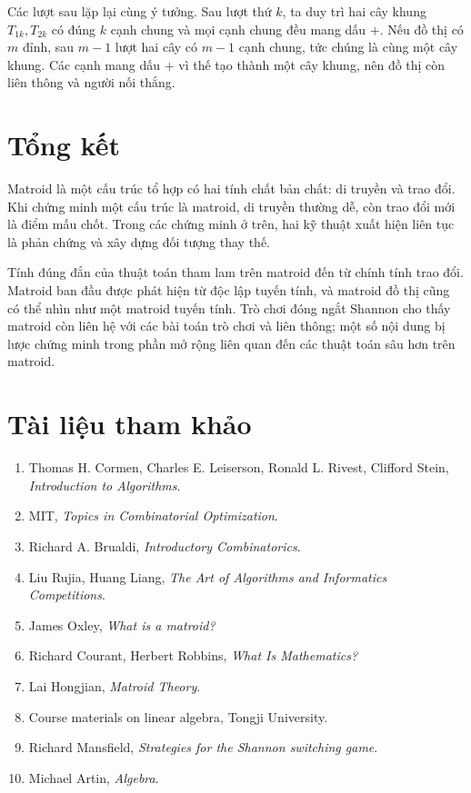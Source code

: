 \documentclass[11pt]{article}
\begin{document}
Các lượt sau lặp lại cùng ý tưởng. Sau lượt thứ \(k\), ta duy trì hai cây
khung \(T_{1k},T_{2k}\) có đúng \(k\) cạnh chung và mọi cạnh chung đều mang
dấu \(+\). Nếu đồ thị có \(m\) đỉnh, sau \(m-1\) lượt hai cây có \(m-1\) cạnh
chung, tức chúng là cùng một cây khung. Các cạnh mang dấu \(+\) vì thế tạo
thành một cây khung, nên đồ thị còn liên thông và người nối thắng.

\section*{Tổng kết}

Matroid là một cấu trúc tổ hợp có hai tính chất bản chất: di truyền và trao
đổi. Khi chứng minh một cấu trúc là matroid, di truyền thường dễ, còn trao đổi
mới là điểm mấu chốt. Trong các chứng minh ở trên, hai kỹ thuật xuất hiện liên
tục là phản chứng và xây dựng đối tượng thay thế.

Tính đúng đắn của thuật toán tham lam trên matroid đến từ chính tính trao đổi.
Matroid ban đầu được phát hiện từ độc lập tuyến tính, và matroid đồ thị cũng
có thể nhìn như một matroid tuyến tính. Trò chơi đóng ngắt Shannon cho thấy
matroid còn liên hệ với các bài toán trò chơi và liên thông; một số nội dung
bị lược chứng minh trong phần mở rộng liên quan đến các thuật toán sâu hơn
trên matroid.

\section*{Tài liệu tham khảo}

\begin{enumerate}
  \item Thomas H. Cormen, Charles E. Leiserson, Ronald L. Rivest, Clifford
        Stein, \textit{Introduction to Algorithms}.
  \item MIT, \textit{Topics in Combinatorial Optimization}.
  \item Richard A. Brualdi, \textit{Introductory Combinatorics}.
  \item Liu Rujia, Huang Liang, \textit{The Art of Algorithms and Informatics
        Competitions}.
  \item James Oxley, \textit{What is a matroid?}
  \item Richard Courant, Herbert Robbins, \textit{What Is Mathematics?}
  \item Lai Hongjian, \textit{Matroid Theory}.
  \item Course materials on linear algebra, Tongji University.
  \item Richard Mansfield, \textit{Strategies for the Shannon switching game}.
  \item Michael Artin, \textit{Algebra}.
\end{enumerate}
\end{document}
